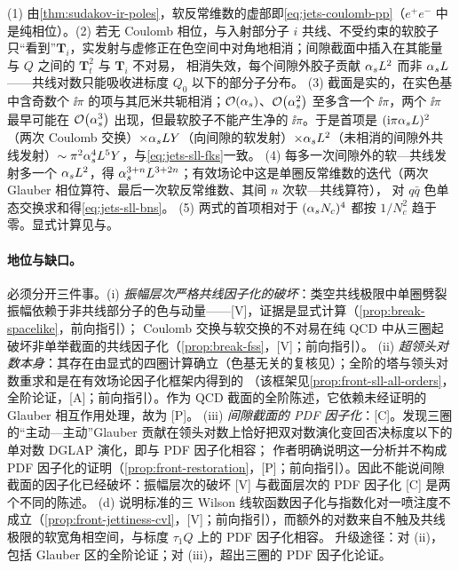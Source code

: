 \begin{proofsketch}
(1) 由\cref{thm:sudakov-ir-poles}，软反常维数的虚部即\cref{eq:jets-coulomb-pp}（$e^+e^-$ 中是纯相位）。(2) 若无 Coulomb 相位，与入射部分子 $i$ 共线、不受约束的软胶子只“看到”$\bm T_i$，实发射与虚修正在色空间中对角地相消；间隙截面中插入在其能量与 $Q$ 之间的 $\bm T_t^2$ 与 $\bm T_i$ 不对易，
相消失效，每个间隙外胶子贡献 $\alpha_s L^2$ 而非 $\alpha_s L$——共线对数只能吸收进标度 $Q_0$ 以下的部分子分布\cite{ForshawKyrieleisSeymour2006}。
(3) 截面是实的，在实色基中含奇数个 $\ii\pi$ 的项与其厄米共轭相消；$\mathcal{O}\!\left(\alpha_s\right)$、$\mathcal{O}\!\left(\alpha_s^2\right)$ 至多含一个 $\ii\pi$，两个 $\ii\pi$ 最早可能在 $\mathcal{O}\!\left(\alpha_s^3\right)$ 出现，但最软胶子不能产生净的 $\ii\pi$\cite{ForshawKyrieleisSeymour2006}。于是首项是 $(\mathrm{i}\pi\alpha_s L)^2$（两次 Coulomb 交换）$\times\alpha_s LY$（向间隙的软发射）$\times\alpha_s L^2$（未相消的间隙外共线发射）$\sim\pi^2\alpha_s^4L^5Y$，与\cref{eq:jets-sll-fks}一致。
(4) 每多一次间隙外的软—共线发射多一个 $\alpha_s L^2$，得 $\alpha_s^{3+n}L^{3+2n}$；有效场论中这是单圈反常维数的迭代（两次 Glauber 相位算符、最后一次软反常维数、其间 $n$ 次软—共线算符\cite{Becher:2021zkk}），
对 $q\bar q$ 色单态交换求和得\cref{eq:jets-sll-bns}。
(5) 两式的首项相对于 $(\alpha_s N_c)^4$ 都按 $1/N_c^2$ 趋于零。显式计算见\cite[第~3~节]{ForshawKyrieleisSeymour2006}与\cite{Forshaw:2008cq}。
\end{proofsketch}

\paragraph{地位与缺口。}
必须分开三件事。(i) \emph{振幅层次严格共线因子化的破坏}：类空共线极限中单圈劈裂振幅依赖于非共线部分子的色与动量——[V]，证据是显式计算（\cref{prop:break-spacelike}，前向指引）；
Coulomb 交换与软交换的不对易在纯 QCD 中从三圈起破坏非单举截面的共线因子化（\cref{prop:break-fss}，[V]；前向指引）。
(ii) \emph{超领头对数本身}：其存在由显式的四圈计算确立\cite{ForshawKyrieleisSeymour2006}（色基无关的复核见\cite{Forshaw:2008cq}）；全阶的塔与领头对数重求和是在有效场论因子化框架内得到的
\cite{Becher:2021zkk,Becher:2023mtx,Boer:2024hzh,Becher:2024nqc}（该框架见\cref{prop:front-sll-all-orders}，全阶论证，[A]；前向指引）。作为 QCD 截面的全阶陈述，它依赖未经证明的 Glauber 相互作用处理，故为 [P]。
(iii) \emph{间隙截面的 PDF 因子化}：[C]。\cite{Becher:2024kmk}发现三圈的“主动—主动”Glauber 贡献在领头对数上恰好把双对数演化变回否决标度以下的单对数 DGLAP 演化，即与 PDF 因子化相容；
作者明确说明这一分析并不构成 PDF 因子化的证明（\cref{prop:front-restoration}，[P]；前向指引）。因此不能说间隙截面的因子化已经破坏：振幅层次的破坏 [V] 与截面层次的 PDF 因子化 [C] 是两个不同的陈述。
(d) 说明标准的三 Wilson 线软函数因子化与指数化对一喷注度不成立（\cref{prop:front-jettiness-cvl}，[V]；前向指引），而额外的对数来自不触及共线极限的软宽角相空间，与标度 $\tau_1Q$ 上的 PDF 因子化相容\cite{Banfi:2025mra}。
升级途径：对 (ii)，包括 Glauber 区的全阶论证；对 (iii)，超出三圈的 PDF 因子化论证。

